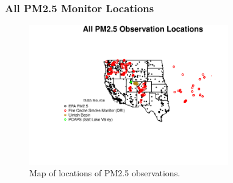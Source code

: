 
\subsubsection*{All PM2.5 Monitor Locations}
\begin{figure} 
\centering 
\includegraphics[width=0.77\textwidth]{Code_Outputs/MapPM25_All_Sites.pdf} 
\caption{\label{fig:MapPM25Loc}Map of locations of PM2.5 observations.} 
\end{figure} 
 
